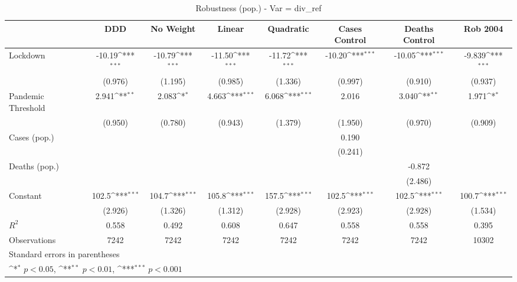 \documentclass{article}
\begin{document}
{
\def\sym#1{\ifmmode^{#1}\else\(^{#1}\)\fi}
\begin{longtable}{l*{7}{c}}
\caption{Robustness (pop.) - Var = div\_ref}\\
\hline\hline\endfirsthead\hline\endhead\hline\endfoot\endlastfoot
                &\multicolumn{1}{c}{DDD}&\multicolumn{1}{c}{No Weight}&\multicolumn{1}{c}{Linear}&\multicolumn{1}{c}{Quadratic}&\multicolumn{1}{c}{Cases Control}&\multicolumn{1}{c}{Deaths Control}&\multicolumn{1}{c}{Rob 2004}\\
\hline
Lockdown        &   -10.19\sym{***}&   -10.79\sym{***}&   -11.50\sym{***}&   -11.72\sym{***}&   -10.20\sym{***}&   -10.05\sym{***}&   -9.839\sym{***}\\
                &  (0.976)         &  (1.195)         &  (0.985)         &  (1.336)         &  (0.997)         &  (0.910)         &  (0.937)         \\
Pandemic Threshold&    2.941\sym{**} &    2.083\sym{*}  &    4.663\sym{***}&    6.068\sym{***}&    2.016         &    3.040\sym{**} &    1.971\sym{*}  \\
                &  (0.950)         &  (0.780)         &  (0.943)         &  (1.379)         &  (1.950)         &  (0.970)         &  (0.909)         \\
Cases (pop.)    &                  &                  &                  &                  &    0.190         &                  &                  \\
                &                  &                  &                  &                  &  (0.241)         &                  &                  \\
Deaths (pop.)   &                  &                  &                  &                  &                  &   -0.872         &                  \\
                &                  &                  &                  &                  &                  &  (2.486)         &                  \\
Constant        &    102.5\sym{***}&    104.7\sym{***}&    105.8\sym{***}&    157.5\sym{***}&    102.5\sym{***}&    102.5\sym{***}&    100.7\sym{***}\\
                &  (2.926)         &  (1.326)         &  (1.312)         &  (2.928)         &  (2.923)         &  (2.928)         &  (1.534)         \\
\hline
\(R^{2}\)       &    0.558         &    0.492         &    0.608         &    0.647         &    0.558         &    0.558         &    0.395         \\
Observations    &     7242         &     7242         &     7242         &     7242         &     7242         &     7242         &    10302         \\
\hline\hline
\multicolumn{8}{l}{\footnotesize Standard errors in parentheses}\\
\multicolumn{8}{l}{\footnotesize \sym{*} \(p<0.05\), \sym{**} \(p<0.01\), \sym{***} \(p<0.001\)}\\
\end{longtable}
}
\end{document}
